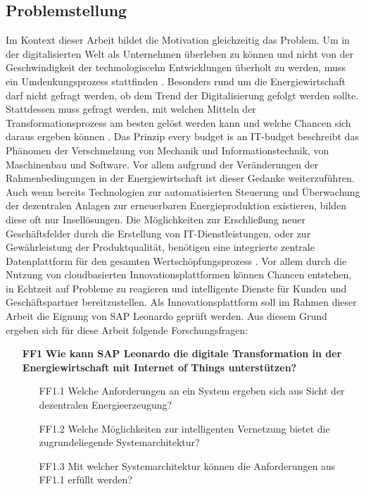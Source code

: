 \subsection{Problemstellung} \label{problemstellung}

Im Kontext dieser Arbeit bildet die Motivation gleichzeitig das Problem. Um in der digitalisierten Welt als Unternehmen überleben zu können und nicht von der Geschwindigkeit der techmologiscehn Entwicklungen überholt zu werden, muss ein Umdenkungsprozess stattfinden \citep{Lauenroth2016}. Besonders rund um die Energiewirtschaft darf nicht gefragt werden, ob dem Trend der Digitalisierung gefolgt werden sollte. Stattdessen muss gefragt werden, mit welchen Mitteln der Transformationsprozess am besten gelöst werden kann und welche Chancen sich daraus ergeben können \citep{Utecht2018}. Das Prinzip \glqq every budget is an IT-budget\grqq{} \citep[S. 5]{Lauenroth2016} beschreibt das Phänomen der Verschmelzung von Mechanik und Informationstechnik, von Maschinenbau und Software. Vor allem aufgrund der Veränderungen der Rahmenbedingungen in der Energiewirtschaft ist dieser Gedanke weiterzuführen. Auch wenn bereits Technologien zur automatisierten Steuerung und Überwachung der dezentralen Anlagen zur erneuerbaren Energieproduktion existieren, bilden diese oft nur Insellösungen. Die Möglichkeiten zur Erschließung neuer Geschäftsfelder durch die Erstellung von IT-Dienstleistungen, oder zur Gewährleistung der Produktqualität, benötigen eine integrierte zentrale Datenplattform für den gesamten Wertschöpfungsprozess \citep{Utecht2018}. Vor allem durch die Nutzung von cloudbasierten Innovationsplattformen können Chancen entstehen, in Echtzeit auf Probleme zu reagieren und intelligente Dienste für Kunden und Geschäftspartner bereitzustellen. Als Innovationsplattform soll im Rahmen dieser Arbeit die Eignung von SAP Leonardo geprüft werden. Aus diesem Grund ergeben sich für diese Arbeit folgende Forschungsfragen: 


\begin{itemize}
  \item[\textbf{FF1}] \textbf{Wie kann SAP Leonardo die digitale Transformation in der Energiewirtschaft mit Internet of Things unterstützen?}
  \begin{itemize}
    \item[FF1.1] Welche Anforderungen an ein System ergeben sich aus Sicht der dezentralen Energieerzeugung?
    \item[FF1.2] Welche Möglichkeiten zur intelligenten Vernetzung bietet die zugrundeliegende Systemarchitektur?
    \item[FF1.3] Mit welcher Systemarchitektur können die Anforderungen aus FF1.1 erfüllt werden?
  \end{itemize}
\end{itemize}

